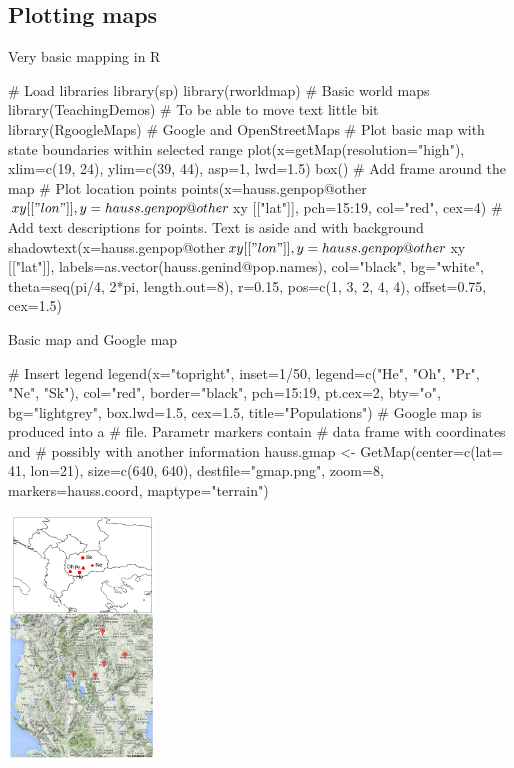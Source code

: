 \documentclass[compress, ucs, xelatex, 11pt, xcolor=svgnames,
  hyperref={
    bookmarks=true,
    unicode=true,
    colorlinks=true,
    pdftitle={Molecular data in R},
    plainpages=false,
    pdfauthor={Vojtech Zeisek},
    pdfsubject={Course about phylogeny and evolution in R},
    pdfcreator={XeLaTeX},
    pdfkeywords={R, evolution, phylogeny, molecular data},
    linkcolor=Tomato,
    anchorcolor=SaddleBrown,
    citecolor=Goldenrod,
    filecolor=DarkMagenta,
    menucolor=Sienna,
    urlcolor=DarkTurquoise,
    pdftex},
  url={hyphens, lowtilde} %
  ]{beamer}
\begin{document}
\subsection{Plotting maps}

\begin{frame}[fragile]{Very basic mapping in R}
  \begin{spluscode}
    # Load libraries
    library(sp)
    library(rworldmap) # Basic world maps
    library(TeachingDemos) # To be able to move text little bit
    library(RgoogleMaps) # Google and OpenStreetMaps
    # Plot basic map with state boundaries within selected range
    plot(x=getMap(resolution="high"), xlim=c(19, 24), ylim=c(39, 44),
      asp=1, lwd=1.5)
    box() # Add frame around the map
    # Plot location points
    points(x=hauss.genpop@other$xy[["lon"]], y=hauss.genpop@other$xy
      [["lat"]], pch=15:19, col="red", cex=4)
    # Add text descriptions for points. Text is aside and with background
    shadowtext(x=hauss.genpop@other$xy[["lon"]], y=hauss.genpop@other$xy
      [["lat"]], labels=as.vector(hauss.genind@pop.names), col="black",
      bg="white", theta=seq(pi/4, 2*pi, length.out=8), r=0.15,
      pos=c(1, 3, 2, 4, 4), offset=0.75, cex=1.5)
  \end{spluscode}
\end{frame}

\begin{frame}[fragile]{Basic map and Google map}
\begin{multicols}{2}
  \begin{spluscode}
    # Insert legend
    legend(x="topright", inset=1/50,
      legend=c("He", "Oh", "Pr", "Ne",
      "Sk"), col="red", border="black",
      pch=15:19, pt.cex=2, bty="o",
      bg="lightgrey", box.lwd=1.5,
      cex=1.5, title="Populations")
    # Google map is produced into a
    # file. Parametr markers contain
    # data frame with coordinates and
    # possibly with another information
    hauss.gmap <- GetMap(center=c(lat=
      41, lon=21), size=c(640, 640),
      destfile="gmap.png", zoom=8,
      markers=hauss.coord,
      maptype="terrain")
  \end{spluscode}
  \begin{center}
    \includegraphics[height=6.5cm]{maps.png}
  \end{center}
\end{multicols}
\end{frame}
\end{document}

